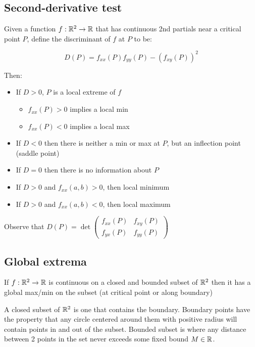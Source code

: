 \subsection{Second-derivative test}

Given a function $f:\mathbb{R}^2 \rightarrow \mathbb{R}$ that has continuous 2nd partials near a critical point $P$, define
the discriminant of $f$ at $P$ to be:

\[D(P)=f_{x x}(P) f_{y y}(P)-\left(f_{x y}(P)\right)^{2}\]

Then:
\begin{itemize}
    \item If $D>0$, $P$ is a local extreme of $f$
    \begin{itemize}
        \item $f_{xx}(P)>0$ implies a local min
        \item $f_{xx}(P)<0$ implies a local max
    \end{itemize}
    \item If $D<0$ then there is neither a min or max at $P$, but an inflection point (saddle point)
    \item If $D=0$ then there is no information about $P$
    \item If $D>0$ and $f_{xx}(a,b)>0$, then local minimum
    \item If $D>0$ and $f_{xx}(a,b)<0$, then local maximum
\end{itemize}

Observe that $D(P)=\operatorname{det}\left(\begin{array}{ll}
                f_{x x}(P) & f_{x y}(P) \\
                f_{y x}(P) & f_{y y}(P)
            \end{array}\right)$

\subsection{Global extrema}

If $f:\mathbb{R}^2 \rightarrow \mathbb{R}$ is continuous on a closed and bounded subset of $\mathbb{R}^2$ then it has a global max/min
on the subset (at critical point or along boundary)

A closed subset of $\mathbb{R}^2$ is one that contains the boundary. Boundary points have the property that
any circle centered around them with positive radius will contain points in and out of the subset.
Bounded subset is where any distance between 2 points in the set never exceeds some fixed bound $M\in \mathbb{R}$.

